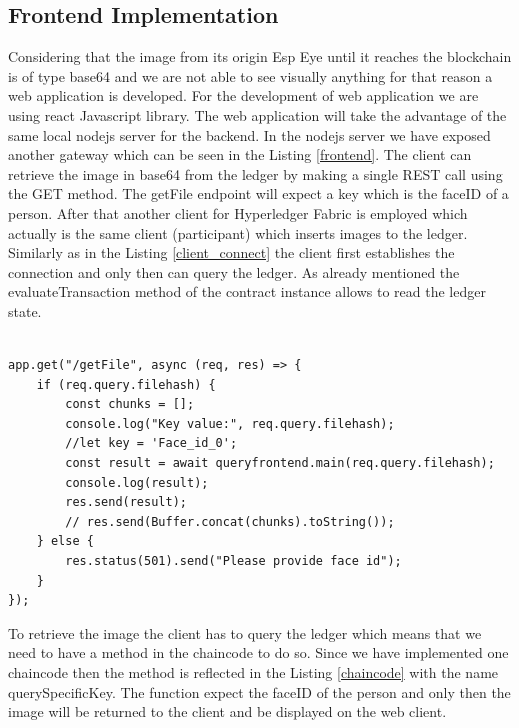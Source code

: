 \subsection{Frontend Implementation}

Considering that the image from its origin Esp Eye until it reaches the blockchain is of type {\selectfont base64} and we are not able to see visually anything for that reason a web application is developed. For the development of web application we are using react Javascript library. The web application will take the advantage of the same local nodejs server for the backend. In the nodejs server we have exposed another gateway which can be seen in the Listing \ref{frontend}. 
The client can retrieve the image in base64 from the ledger by making a single REST call using the GET method. The {\selectfont getFile} endpoint will expect a key which is the faceID of a person. After that another client for Hyperledger Fabric is employed which actually is the same client (participant) which inserts images to the ledger. Similarly as in the Listing \ref{client_connect} the client first establishes the connection and only then can query the ledger. As already mentioned the {\selectfont evaluateTransaction} method of the {\selectfont contract} instance allows to read the ledger state.  

\begin{lstlisting}[caption={The API gateway serving the web application.},label=frontend, captionpos=b]

app.get("/getFile", async (req, res) => {
    if (req.query.filehash) {
        const chunks = [];
        console.log("Key value:", req.query.filehash);
        //let key = 'Face_id_0';
        const result = await queryfrontend.main(req.query.filehash);
        console.log(result);
        res.send(result);
        // res.send(Buffer.concat(chunks).toString());
    } else {
        res.status(501).send("Please provide face id");
    }
});

\end{lstlisting}

To retrieve the image the client has to query the ledger which means that we need to have a method in the chaincode to do so. Since we have implemented one chaincode then the method is reflected in the Listing \ref{chaincode} with the name {\selectfont querySpecificKey}. The function expect the faceID of the person and only then the image will be returned to the client and be displayed on the web client. 









